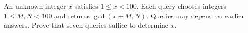 An unknown integer $x$ satisfies $1\le x<100$. Each query chooses integers $1\le M,N<100$ and returns $\gcd(x+M,N)$. Queries may depend on earlier answers. Prove that seven queries suffice to determine $x$.
